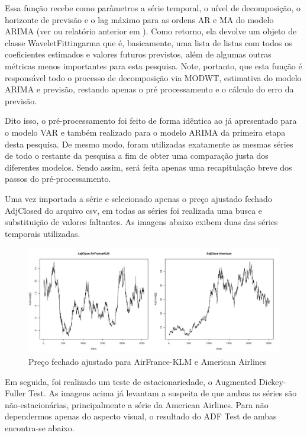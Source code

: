 \documentclass[12pt]{article}
\begin{document}
	Essa função recebe como parâmetros a série temporal, o nível de decomposição, o horizonte de previsão e o \textrm{lag} máximo para as ordens AR e MA do modelo ARIMA (ver \cite{Tsay} ou relatório anterior em \cite{git}). Como retorno, ela devolve um objeto de classe \textrm{WaveletFittingarma} que é, basicamente, uma lista de listas com todos os coeficientes estimados e valores futuros previstos, além de algumas outras métricas menos importantes para esta pesquisa. Note, portanto, que esta função é responsável todo o processo de decomposição via MODWT, estimativa do modelo ARIMA e previsão, restando apenas o pré processamento e o cálculo do erro da previsão.
	
	Dito isso, o pré-processamento foi feito de forma idêntica ao já apresentado para o modelo VAR e também realizado para o modelo ARIMA da primeira etapa desta pesquisa. De mesmo modo, foram utilizadas exatamente as mesmas séries de todo o restante da pesquisa a fim de obter uma comparação justa dos diferentes modelos. Sendo assim, será feita apenas uma recapitulação breve dos passos do pré-processamento. 
	
	Uma vez importada a série e selecionado apenas o preço ajustado fechado \textrm{AdjClosed} do arquivo \textrm{csv}, em todas as séries foi realizada uma busca e substituição de valores faltantes. As imagens abaixo exibem duas das séries temporais utilizadas.
	
	\begin{figure}[H]
		\centering
		\includegraphics[width=1.0\linewidth]{Imagens/AdjCloseWavelets}
		\caption{Preço fechado ajustado para AirFrance-KLM e American Airlines}
		\label{fig:adjclosewavelets}
	\end{figure}
	
	Em seguida, foi realizado um teste de estacionariedade, o \textrm{Augmented Dickey-Fuller Test}. As imagens acima já levantam a suspeita de que ambas as séries são não-estacionárias, principalmente a série da \textrm{American Airlines}. Para não dependermos apenas do aspecto visual, o resultado do \textrm{ADF Test} de ambas encontra-se abaixo.
	
\end{document}
